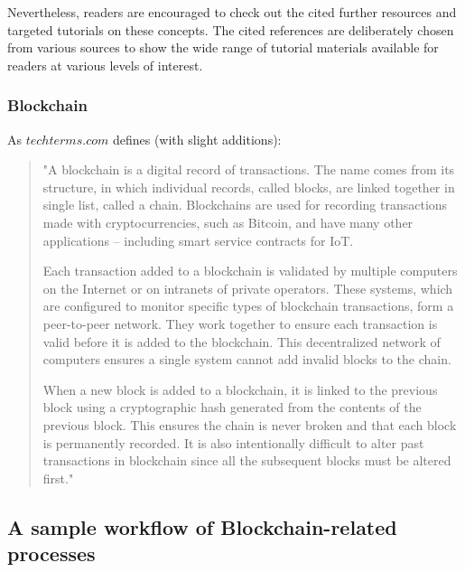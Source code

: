 \documentclass[a4paper]{article}
\begin{document}
Nevertheless, readers are encouraged to check out the cited further resources and targeted tutorials on these concepts. The cited references are deliberately chosen from various sources to show the wide range of tutorial materials available for readers at various levels of interest. 

\subsubsection{Blockchain}
As $techterms.com$ \cite{techterms} defines (with slight additions):
\begin{quote}
    "A blockchain is a digital record of transactions. The name comes from its structure, in which individual records, called blocks, are linked together in single list, called a chain. Blockchains are used for recording transactions made with cryptocurrencies, such as Bitcoin, and have many other applications -- including smart service contracts for IoT.
    
    Each transaction added to a blockchain is validated by multiple computers on the Internet or on intranets of private operators. These systems, which are configured to monitor specific types of blockchain transactions, form a peer-to-peer network. They work together to ensure each transaction is valid before it is added to the blockchain. This decentralized network of computers ensures a single system cannot add invalid blocks to the chain.
    
    When a new block is added to a blockchain, it is linked to the previous block using a cryptographic hash generated from the contents of the previous block. This ensures the chain is never broken and that each block is permanently recorded. It is also intentionally difficult to alter past transactions in blockchain since all the subsequent blocks must be altered first."
\end{quote}

\subsection{A sample workflow of Blockchain-related processes}
\end{document}
